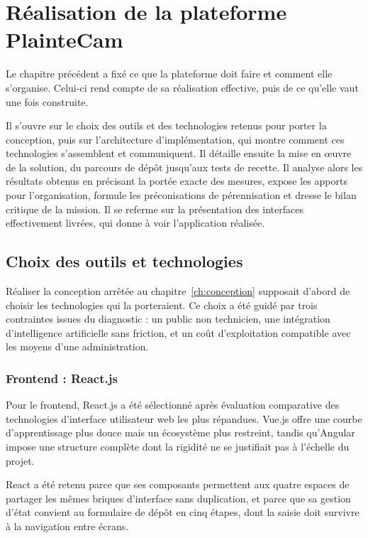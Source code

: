 
\chapter{Réalisation de la plateforme PlainteCam}
\label{ch:realisation}
\label{ch:bilan}

Le chapitre précédent a fixé ce que la plateforme doit faire et comment elle s'organise. Celui-ci rend compte de sa réalisation effective, puis de ce qu'elle vaut une fois construite.

Il s'ouvre sur le choix des outils et des technologies retenus pour porter la conception, puis sur l'architecture d'implémentation, qui montre comment ces technologies s'assemblent et communiquent. Il détaille ensuite la mise en œuvre de la solution, du parcours de dépôt jusqu'aux tests de recette. Il analyse alors les résultats obtenus en précisant la portée exacte des mesures, expose les apports pour l'organisation, formule les préconisations de pérennisation et dresse le bilan critique de la mission. Il se referme sur la présentation des interfaces effectivement livrées, qui donne à voir l'application réalisée.

\section{Choix des outils et technologies}

Réaliser la conception arrêtée au chapitre~\ref{ch:conception} supposait d'abord de choisir les technologies qui la porteraient. Ce choix a été guidé par trois contraintes issues du diagnostic : un public non technicien, une intégration d'intelligence artificielle sans friction, et un coût d'exploitation compatible avec les moyens d'une administration.

\subsection{Frontend : React.js}

Pour le frontend, React.js a été sélectionné après évaluation comparative des technologies d'interface utilisateur web les plus répandues. Vue.js offre une courbe d'apprentissage plus douce mais un écosystème plus restreint, tandis qu'Angular impose une structure complète dont la rigidité ne se justifiait pas à l'échelle du projet.

React a été retenu parce que ses composants permettent aux quatre espaces de partager les mêmes briques d'interface sans duplication, et parce que sa gestion d'état convient au formulaire de dépôt en cinq étapes, dont la saisie doit survivre à la navigation entre écrans.

